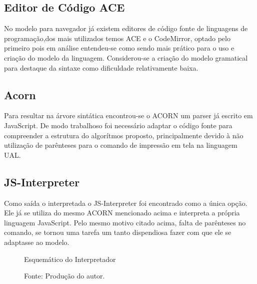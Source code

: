 \subsection{Editor de Código ACE}

No modelo para navegador já existem editores de código fonte de linguagens de programação,dos mais utilizados temos ACE\nocite{ace} e o CodeMirror\nocite{codemirror}, optado pelo primeiro pois em análise entendeu-se como sendo mais prático para o uso e criação do modelo da linguagem. Considerou-se a criação do modelo gramatical para destaque da sintaxe como dificuldade relativamente baixa.

\subsection{Acorn}

Para resultar na árvore sintática encontrou-se o ACORN\nocite{acorn} um parser já escrito em JavaScript. De modo trabalhoso foi necessário adaptar o código fonte para compreender a estrutura do algorítmos proposto, principalmente devido à não utilização de parênteses para o comando de impressão em tela na linguagem UAL.

\subsection{JS-Interpreter}

Como saída o interpretada o JS-Interpreter\nocite{jsinterpreter} foi encontrado como a única opção. Ele já se utiliza do mesmo ACORN mencionado acima e interpreta a própria linguagem JavaScript. Pelo mesmo motivo citado acima, falta de parênteses no comando, se tornou uma tarefa um tanto dispendiosa fazer com que ele se adaptasse ao modelo.

\begin{figure}[h]
  \caption{Esquemático do Interpretador}\label{fig:flux}
  \centering
  \setlength{\fboxsep}{0pt}%
\setlength{\fboxrule}{1pt}%
  \caption*{\footnotesize Fonte: Produção do autor.}
\end{figure}

